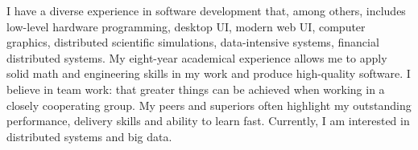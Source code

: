 

\begin{cvparagraph}
I have a diverse experience in software development that, among others, includes low-level hardware programming, desktop UI, modern web UI, computer graphics, distributed scientific simulations, data-intensive systems, financial distributed systems.
My eight-year academical experience allows me to apply solid math and engineering skills in my work and produce high-quality software.
I believe in team work: that greater things can be achieved when working in a closely cooperating group.
My peers and superiors often highlight my outstanding performance, delivery skills and ability to learn fast.
Currently, I am interested in distributed systems and big data.
\end{cvparagraph}
